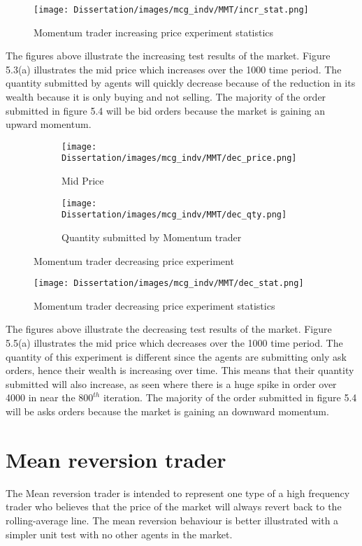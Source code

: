 \begin{figure}[h]
\texttt{[image: Dissertation/images/mcg\_indv/MMT/incr\_stat.png]}
\caption{Momentum trader increasing price experiment statistics} 
\end{figure} 
\FloatBarrier

The figures above illustrate the increasing test results of the market. Figure 5.3(a) illustrates the mid price which increases over the 1000 time period. The quantity submitted by agents will quickly decrease because of the reduction in its wealth because it is only buying and not selling. The majority of the order submitted in figure 5.4 will be bid orders because the market is gaining an upward momentum. 

\begin{figure}[h]
  \begin{subfigure}[b]{0.5\textwidth}
    \texttt{[image: Dissertation/images/mcg\_indv/MMT/dec\_price.png]}
    \caption{Mid Price}
    \label{fig:1}
  \end{subfigure}
  \begin{subfigure}[b]{0.5\textwidth}
    \texttt{[image: Dissertation/images/mcg\_indv/MMT/dec\_qty.png]}
    \caption{Quantity submitted by Momentum trader}
    \label{fig:2}
  \end{subfigure}
\caption{Momentum trader decreasing price experiment} 
\end{figure}


\begin{figure}[h]
\texttt{[image: Dissertation/images/mcg\_indv/MMT/dec\_stat.png]}
\caption{Momentum trader decreasing price experiment statistics} 
\end{figure} 
\FloatBarrier

The figures above illustrate the decreasing test results of the market. Figure 5.5(a) illustrates the mid price which decreases over the 1000 time period. The quantity of this experiment is different since the agents are submitting only ask orders, hence their wealth is increasing over time. This means that their quantity submitted will also increase, as seen where there is a huge spike in order over 4000 in near the $800^{th}$ iteration. The majority of the order submitted in figure 5.4 will be asks orders because the market is gaining an downward momentum. 

\section{Mean reversion trader}
The Mean reversion trader is intended to represent one type of a high frequency trader who believes that the price of the market will always revert back to the rolling-average line. The mean reversion behaviour is better illustrated with a simpler unit test with no other agents in the market.


